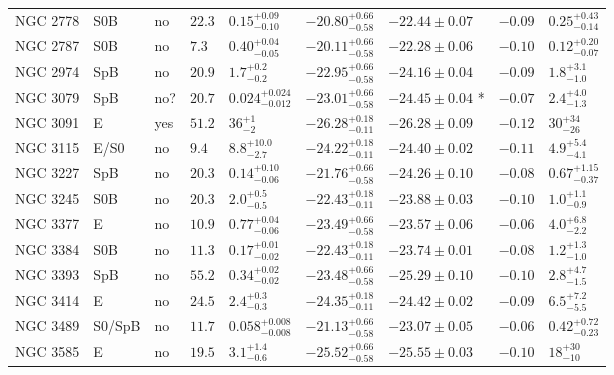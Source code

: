 \begin{table*}
\begin{center}
\begin{tabular}{lllllllll}
NGC 2778  &  S0B  &  no   &  $22.3$  &  $0.15_{-0.10}^{+0.09}$   &  $-20.80_{-0.58}^{+0.66}$   &  $-22.44 \pm 0.07$   &  $-0.09$  &  $0.25_{-0.14}^{+0.43}$   \\ 
NGC 2787  &  S0B  &  no   &  $7.3$  &  $0.40_{-0.05}^{+0.04}$   &  $-20.11_{-0.58}^{+0.66}$   &  $-22.28 \pm 0.06$   &  $-0.10$  &  $0.12_{-0.07}^{+0.20}$   \\ 
NGC 2974  &  SpB  &  no   &  $20.9$  &  $1.7_{-0.2}^{+0.2}$   &  $-22.95_{-0.58}^{+0.66}$   &  $-24.16 \pm 0.04$   &  $-0.09$  &  $1.8_{-1.0}^{+3.1}$   \\ 
NGC 3079  &  SpB  &  no?  &  $20.7$  &  $0.024_{-0.012}^{+0.024}$   &  $-23.01_{-0.58}^{+0.66}$   &  $-24.45 \pm 0.04$  *  &  $-0.07$  &  $2.4_{-1.3}^{+4.0}$   \\ 
NGC 3091  &  E  &  yes   &  $51.2$  &  $36_{-2}^{+1}$   &  $-26.28_{-0.11}^{+0.18}$   &  $-26.28 \pm 0.09$   &  $-0.12$  &  $30_{-26}^{+34}$   \\ 
NGC 3115  &  E/S0  &  no   &  $9.4$  &  $8.8_{-2.7}^{+10.0}$   &  $-24.22_{-0.11}^{+0.18}$   &  $-24.40 \pm 0.02$   &  $-0.11$  &  $4.9_{-4.1}^{+5.4}$   \\ 
NGC 3227  &  SpB  &  no   &  $20.3$  &  $0.14_{-0.06}^{+0.10}$   &  $-21.76_{-0.58}^{+0.66}$   &  $-24.26 \pm 0.10$   &  $-0.08$  &  $0.67_{-0.37}^{+1.15}$   \\ 
NGC 3245  &  S0B  &  no   &  $20.3$  &  $2.0_{-0.5}^{+0.5}$   &  $-22.43_{-0.11}^{+0.18}$   &  $-23.88 \pm 0.03$   &  $-0.10$  &  $1.0_{-0.9}^{+1.1}$   \\ 
NGC 3377  &  E  &  no   &  $10.9$  &  $0.77_{-0.06}^{+0.04}$   &  $-23.49_{-0.58}^{+0.66}$   &  $-23.57 \pm 0.06$   &  $-0.06$  &  $4.0_{-2.2}^{+6.8}$   \\ 
NGC 3384  &  S0B  &  no   &  $11.3$  &  $0.17_{-0.02}^{+0.01}$   &  $-22.43_{-0.11}^{+0.18}$   &  $-23.74 \pm 0.01$   &  $-0.08$  &  $1.2_{-1.0}^{+1.3}$   \\ 
NGC 3393  &  SpB  &  no   &  $55.2$  &  $0.34_{-0.02}^{+0.02}$   &  $-23.48_{-0.58}^{+0.66}$   &  $-25.29 \pm 0.10$   &  $-0.10$  &  $2.8_{-1.5}^{+4.7}$   \\ 
NGC 3414  &  E  &  no   &  $24.5$  &  $2.4_{-0.3}^{+0.3}$   &  $-24.35_{-0.11}^{+0.18}$   &  $-24.42 \pm 0.02$   &  $-0.09$  &  $6.5_{-5.5}^{+7.2}$   \\ 
NGC 3489  &  S0/SpB  &  no   &  $11.7$  &  $0.058_{-0.008}^{+0.008}$   &  $-21.13_{-0.58}^{+0.66}$   &  $-23.07 \pm 0.05$   &  $-0.06$  &  $0.42_{-0.23}^{+0.72}$   \\ 
NGC 3585  &  E  &  no   &  $19.5$  &  $3.1_{-0.6}^{+1.4}$   &  $-25.52_{-0.58}^{+0.66}$   &  $-25.55 \pm 0.03$   &  $-0.10$  &  $18_{-10}^{+30}$   \\ 

\end{tabular}
\end{center}
\end{table*}
